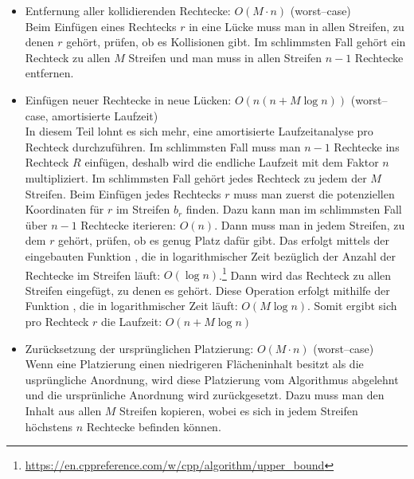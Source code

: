 \begin{itemize}
\begin{itemize}
		\item Entfernung aller kollidierenden Rechtecke: $O(M \cdot n)$ (worst--case)\\
		Beim Einfügen eines Rechtecks $r$ in eine Lücke muss man in allen Streifen, zu denen $r$
		gehört, prüfen, ob es Kollisionen gibt.
		Im schlimmsten Fall gehört ein Rechteck zu allen $M$ Streifen und man muss in allen
		Streifen $n-1$ Rechtecke entfernen.

		\item Einfügen neuer Rechtecke in neue Lücken: $O(n(n + M \log n))$
		(worst--case, amortisierte Laufzeit)\\
		In diesem Teil lohnt es sich mehr, eine amortisierte Laufzeitanalyse pro Rechteck durchzuführen.
		Im schlimmsten Fall muss man $n-1$ Rechtecke ins Rechteck $R$ einfügen, deshalb
		wird die endliche Laufzeit mit dem Faktor $n$ multipliziert.
		Im schlimmsten Fall gehört jedes Rechteck zu jedem der $M$ Streifen.
		Beim Einfügen jedes Rechtecks $r$ muss man zuerst die potenziellen Koordinaten
		für $r$ im Streifen $b_r$ finden.
		Dazu kann man im schlimmsten Fall über $n-1$ Rechtecke iterieren: $O(n)$.
		Dann muss man in jedem Streifen, zu dem $r$ gehört, 
		prüfen, ob es genug Platz dafür gibt.
		Das erfolgt mittels der eingebauten Funktion ,
		die in logarithmischer Zeit bezüglich der Anzahl der Rechtecke im
		Streifen läuft: $O(\log n)$.\footnote{\href{https://en.cppreference.com/w/cpp/algorithm/upper_bound}{https://en.cppreference.com/w/cpp/algorithm/upper\_bound}}
		Dann wird das Rechteck zu allen Streifen eingefügt, zu denen es gehört.
		Diese Operation erfolgt mithilfe der Funktion , die in
		logarithmischer Zeit läuft: $O(M \log n)$.
		Somit ergibt sich pro Rechteck $r$ die Laufzeit: $O(n + M \log n)$

		\item Zurücksetzung der ursprünglichen Platzierung: $O(M \cdot n)$ (worst--case)\\
		Wenn eine Platzierung einen niedrigeren Flächeninhalt besitzt als 
		die usprüngliche Anordnung, wird diese Platzierung vom Algorithmus abgelehnt
		und die ursprünliche Anordnung wird zurückgesetzt.
		Dazu muss man den Inhalt aus allen $M$ Streifen kopieren, wobei es sich in jedem Streifen höchstens 
		$n$ Rechtecke befinden können.
	\end{itemize}

\end{itemize}

